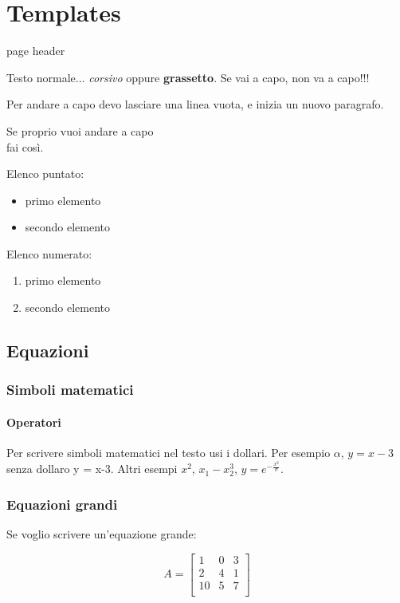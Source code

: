 
\chapter{Templates} %
\label{Chapter0} page header

Testo normale... \emph{corsivo} oppure \textbf{grassetto}.
Se vai a capo, non va a capo!!!

Per andare a capo devo lasciare una linea vuota, e inizia un nuovo paragrafo.

Se proprio vuoi andare a capo \\ fai così.

Elenco puntato:
\begin{itemize}
	\item primo elemento
	\item secondo elemento
\end{itemize}

Elenco numerato:
\begin{enumerate}
	\item primo elemento
	\item secondo elemento
\end{enumerate}

\section{Equazioni}
\label{sec:equazioni}

\subsection{Simboli matematici}

\subsubsection{Operatori}

Per scrivere simboli matematici nel testo usi i dollari. Per esempio $\alpha$, $y = x-3$ senza dollaro y = x-3. Altri esempi $x^2$, $x_1-x_2^3$, $y = e^{-\frac{x^2}{\sigma}}$.

\subsection{Equazioni grandi}

Se voglio scrivere un'equazione grande:

\begin{equation}
A = \begin{bmatrix}
		1 & 0 & 3 \\
		2 & 4 & 1 \\
		10 & 5 & 7 \\
		\end{bmatrix}
		\label{eq:matrice}
\end{equation}

